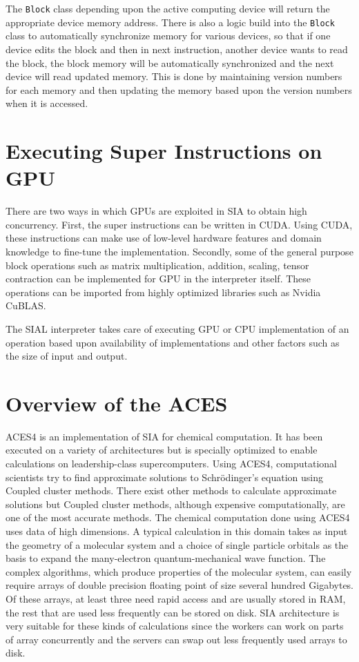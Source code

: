 The \texttt{Block} class depending upon the active computing device will return the
appropriate device memory address. There is also a logic build into the \texttt{Block}
class to automatically synchronize memory for various devices, so that if one
device edits the block and then in next instruction, another device wants
to read the block, the block memory will be automatically synchronized and the
next device will read updated memory. This is done by maintaining version numbers
for each memory and then updating the memory based upon the version numbers when
it is accessed.

\section{Executing Super Instructions on GPU}
There are two ways in which GPUs are exploited in SIA to obtain high concurrency.
First, the super instructions can be written in CUDA.
Using CUDA, these instructions can make use of low-level hardware
features and domain knowledge to fine-tune the implementation. Secondly, some of
the general purpose block operations such as matrix multiplication, addition,
scaling, tensor contraction can be implemented for GPU in the interpreter
itself. These operations can be imported from highly optimized libraries such as
Nvidia CuBLAS.

The SIAL interpreter takes care of executing GPU or CPU implementation of an
operation based upon availability of implementations and other factors such as
the size of input and output.

\section{Overview of the ACES}
ACES4 is an implementation of SIA for chemical computation. It has been executed
on a variety of architectures but is specially optimized to enable
calculations on leadership-class supercomputers. Using ACES4, computational scientists
try to find approximate solutions to Schrödinger’s equation using Coupled cluster
methods. There exist other methods to calculate approximate solutions but Coupled
cluster methods, although expensive computationally, are one of the most accurate methods.
The chemical computation done using ACES4 uses data of high dimensions. A typical calculation in this domain
takes as input the geometry of a molecular system and a choice of single
particle orbitals as the basis to expand the many-electron quantum-mechanical wave
function. The complex algorithms, which produce properties of the molecular
system, can easily require arrays of double precision floating point of size
several hundred Gigabytes. Of these arrays, at least three need rapid access and
are usually stored in RAM, the rest that are used less frequently can be stored
on disk. SIA architecture is very suitable for these kinds of calculations since
the workers can work on parts of array concurrently and the servers can swap out
less frequently used arrays to disk.
